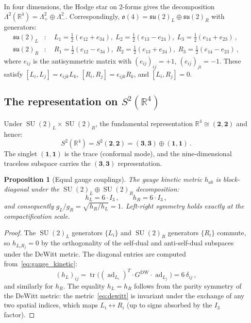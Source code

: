 \documentclass[12pt,a4paper]{article}
\newtheorem{proposition}[theorem]{Proposition}
\theoremstyle{definition}
\newcommand{\tr}{\operatorname{tr}}
\newcommand{\SU}{\operatorname{SU}}
\newcommand{\ad}{\operatorname{ad}}
\newcommand{\R}{\mathbb{R}}
\begin{document}
In four dimensions, the Hodge star on 2-forms gives the decomposition $\Lambda^2(\R^4) = \Lambda^2_+ \oplus \Lambda^2_-$.
Correspondingly, $\mathfrak{o}(4) = \mathfrak{su}(2)_L \oplus \mathfrak{su}(2)_R$ with generators:
\begin{align}
\label{eq:su2_generators}
\mathfrak{su}(2)_L&\colon\quad L_1 = \tfrac{1}{2}(e_{12} + e_{34}),\; L_2 = \tfrac{1}{2}(e_{13} - e_{24}),\; L_3 = \tfrac{1}{2}(e_{14} + e_{23})\,,\\
\mathfrak{su}(2)_R&\colon\quad R_1 = \tfrac{1}{2}(e_{12} - e_{34}),\; R_2 = \tfrac{1}{2}(e_{13} + e_{24}),\; R_3 = \tfrac{1}{2}(e_{14} - e_{23})\,,
\end{align}
where $e_{ij}$ is the antisymmetric matrix with $(e_{ij})_{ij} = +1$, $(e_{ij})_{ji} = -1$.
These satisfy $[L_i, L_j] = \epsilon_{ijk} L_k$, $[R_i, R_j] = \epsilon_{ijk} R_k$, and $[L_i, R_j] = 0$.

\subsection{The representation on $S^2(\R^4)$}

Under $\SU(2)_L \times \SU(2)_R$, the fundamental representation $\R^4 \cong (\mathbf{2}, \mathbf{2})$ and hence:
\begin{equation}
S^2(\R^4) = S^2(\mathbf{2},\mathbf{2}) = (\mathbf{3},\mathbf{3}) \oplus (\mathbf{1},\mathbf{1})\,.
\end{equation}
The singlet $(\mathbf{1},\mathbf{1})$ is the trace (conformal mode), and the nine-dimensional traceless subspace carries the $(\mathbf{3},\mathbf{3})$ representation.

\begin{proposition}[Equal gauge couplings]
\label{prop:equal_couplings}
The gauge kinetic metric $h_{ab}$ is block-diagonal under the $\SU(2)_L \oplus \SU(2)_R$ decomposition:
\begin{equation}
h_L = 6\cdot I_3\,,\qquad h_R = 6\cdot I_3\,,
\end{equation}
and consequently $g_L/g_R = \sqrt{h_R/h_L} = 1$.
Left-right symmetry holds exactly at the compactification scale.
\end{proposition}

\begin{proof}
The $\SU(2)_L$ generators $\{L_i\}$ and $\SU(2)_R$ generators $\{R_i\}$ commute, so $h_{L_i R_j} = 0$ by the orthogonality of the self-dual and anti-self-dual subspaces under the DeWitt metric.
The diagonal entries are computed from~\eqref{eq:gauge_kinetic}:
\begin{equation}
(h_L)_{ij} = \tr\!\big((\ad_{L_i})^T\! \cdot G^{\mathrm{DW}} \cdot \ad_{L_j}\big) = 6\,\delta_{ij}\,,
\end{equation}
and similarly for $h_R$.
The equality $h_L = h_R$ follows from the parity symmetry of the DeWitt metric: the metric~\eqref{eq:dewitt} is invariant under the exchange of any two spatial indices, which maps $L_i \leftrightarrow R_i$ (up to signs absorbed by the $I_3$ factor).
\end{proof}
\end{document}
